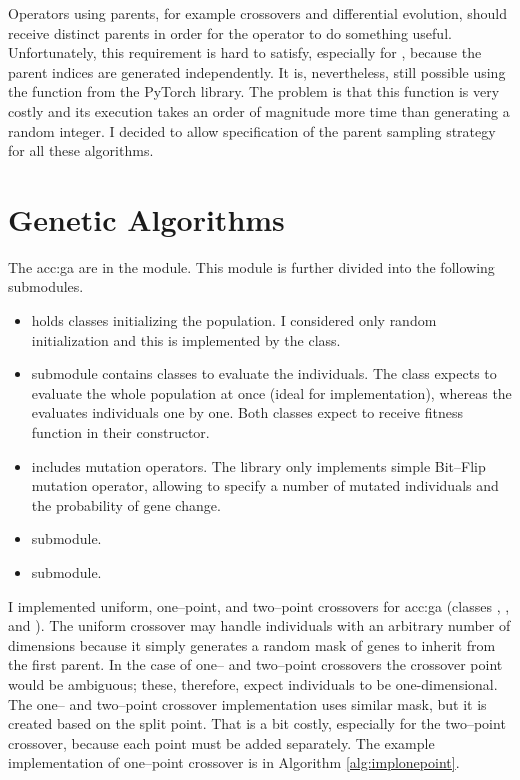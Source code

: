 Operators using parents, for example crossovers and differential evolution, should receive distinct parents in order for the operator to do something useful. Unfortunately, this requirement is hard to satisfy, especially for \gpuns, because the parent indices are generated independently. It is, nevertheless, still possible using the  function from the PyTorch library. The problem is that this function is very costly and its execution takes an order of magnitude more time than generating a random integer. I decided to allow specification of the parent sampling strategy for all these algorithms.



\section{Genetic Algorithms}
\label{chap:gaimpl}

The \acrlong{acc:ga} are in the  module. This module is further divided into the following submodules.
\begin{itemize}
    \item {} holds classes initializing the population. I considered only random initialization and this is implemented by the  class.
    \item {} submodule contains classes to evaluate the individuals. The  class expects to evaluate the whole population at once (ideal for \gpu implementation), whereas the  evaluates individuals one by one. Both classes expect to receive fitness function in their constructor.
    \item {} includes mutation operators. The library only implements simple Bit--Flip mutation operator, allowing to specify a number of mutated individuals and the probability of gene change.
    \item {} submodule.
    \item {} submodule.
\end{itemize}

I implemented uniform, one--point, and two--point crossovers for \acrshort{acc:ga} (classes , , and ). The uniform crossover may handle individuals with an arbitrary number of dimensions because it simply generates a random mask of genes to inherit from the first parent. In the case of one-- and two--point crossovers the crossover point would be ambiguous; these, therefore, expect individuals to be one-dimensional. The one-- and two--point crossover implementation uses similar mask, but it is created based on the split point. That is a bit costly, especially for the two--point crossover, because each point must be added separately. The example implementation of one--point crossover is in Algorithm \ref{alg:implonepoint}.

